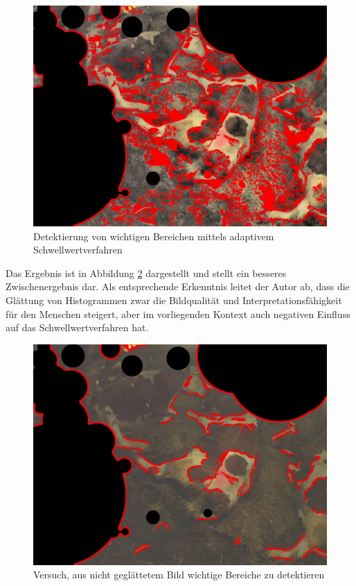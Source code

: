 \begin{figure}[H]
	\center
	\includegraphics[scale=0.43]{Grafiken/entwicklung/10thresholdedEqualizedBirghtened.jpg}
	\caption{Detektierung von wichtigen Bereichen mittels adaptivem Schwellwertverfahren} 
	\label{fig: Detektierung von wichtigen Bereichen mittels adaptivem Schwellwertverfahren} 
\end{figure}

Das Ergebnis ist in Abbildung \ref{fig: Versuch, aus nicht geglättetem Bild wichtige Bereiche zu detektieren} dargestellt und stellt ein besseres Zwischenergebnis dar. Als entsprechende Erkenntnis leitet der Autor ab, dass die Glättung von Histogrammen zwar die Bildqualität und Interpretationsfähigkeit für den Menschen steigert, aber im vorliegenden Kontext auch negativen Einfluss auf das Schwellwertverfahren hat.

\begin{figure}[H]
	\center
	\includegraphics[scale=0.43]{Grafiken/entwicklung/11thresholdedNotEqualized.jpg}
	\caption{Versuch, aus nicht geglättetem Bild wichtige Bereiche zu detektieren} 
	\label{fig: Versuch, aus nicht geglättetem Bild wichtige Bereiche zu detektieren} 
\end{figure}

